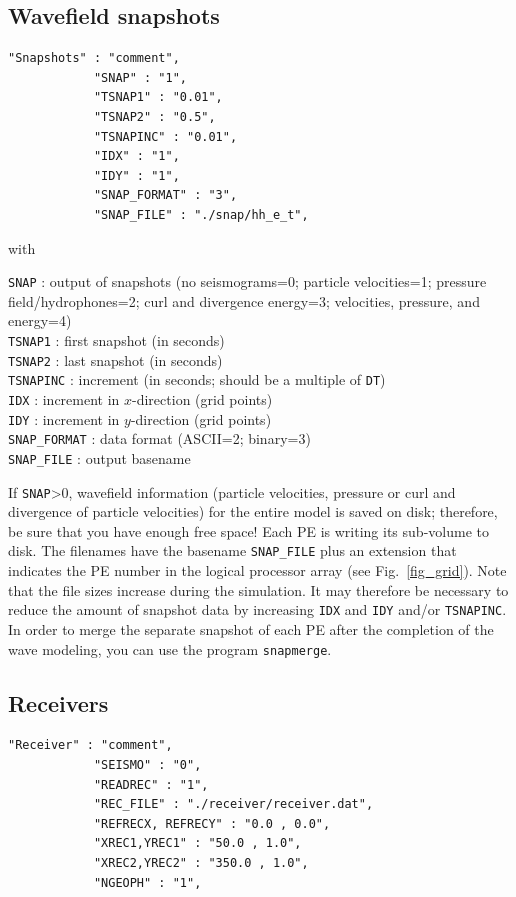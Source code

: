 \subsection{Wavefield snapshots}
\begin{verbatim}
"Snapshots" : "comment",
            "SNAP" : "1",
            "TSNAP1" : "0.01",
            "TSNAP2" : "0.5",
            "TSNAPINC" : "0.01",
            "IDX" : "1",
            "IDY" : "1",
            "SNAP_FORMAT" : "3",
            "SNAP_FILE" : "./snap/hh_e_t",
\end{verbatim}

with

\texttt{SNAP} : output of snapshots (no seismograms=0; particle velocities=1; pressure field/hydrophones=2; curl and divergence energy=3; velocities, pressure, and energy=4)\\
\texttt{TSNAP1} : first snapshot (in seconds)\\
\texttt{TSNAP2} : last snapshot (in seconds)\\
\texttt{TSNAPINC} : increment (in seconds; should be a multiple of \texttt{DT})\\
\texttt{IDX} : increment in $x$-direction (grid points)\\
\texttt{IDY} : increment in $y$-direction (grid points)\\
\texttt{SNAP\_FORMAT} : data format (ASCII=2; binary=3)\\
\texttt{SNAP\_FILE} : output basename

If \texttt{SNAP}>0, wavefield information (particle velocities, pressure or curl and divergence of particle velocities) for the entire model is saved on disk; therefore, be sure that you have enough free space! Each PE is writing its sub-volume to disk. The filenames have the basename \texttt{SNAP\_FILE} plus an extension that indicates the PE number in the logical processor array (see Fig.~\ref{fig_grid}). Note that the file sizes increase during the simulation. It may therefore be necessary to reduce the amount of snapshot data by increasing \texttt{IDX} and \texttt{IDY} and/or \texttt{TSNAPINC}. In order to merge the separate snapshot of each PE after the completion of the wave modeling, you can use the program \texttt{snapmerge}.

\subsection{Receivers}
\begin{verbatim}
"Receiver" : "comment",
            "SEISMO" : "0",
            "READREC" : "1",
            "REC_FILE" : "./receiver/receiver.dat",
            "REFRECX, REFRECY" : "0.0 , 0.0",
            "XREC1,YREC1" : "50.0 , 1.0",
            "XREC2,YREC2" : "350.0 , 1.0",
            "NGEOPH" : "1",
\end{verbatim}


